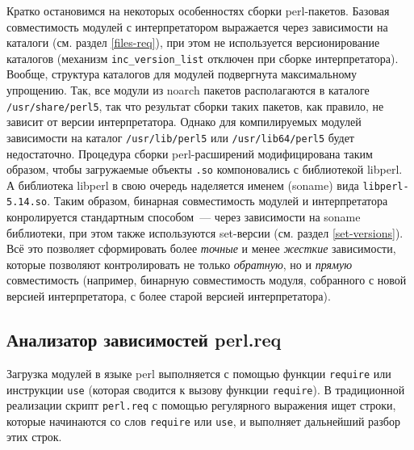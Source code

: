 \documentclass[russian,a4paper,12pt,titlepage]{article}
\begin{document}
Кратко остановимся на некоторых особенностях сборки perl-пакетов.  Базовая совместимость модулей
с интерпретатором выражается через зависимости на каталоги (см. раздел \ref{files-req}), при этом
не используется версионирование каталогов (механизм \verb|inc_version_list|
отключен при сборке интерпретатора).  Вообще, структура каталогов для модулей подвергнута максимальному упрощению.
Так, все модули из noarch пакетов располагаются в каталоге \verb|/usr/share/perl5|, так что результат
сборки таких пакетов, как правило, не зависит от версии интерпретатора.  Однако для компилируемых
модулей зависимости на каталог \verb|/usr/lib/perl5| или \verb|/usr/lib64/perl5| будет недостаточно.
Процедура сборки perl-расширений модифицирована таким образом, чтобы загружаемые объекты \verb|.so| компоновались
с библиотекой libperl.  А библиотека libperl в свою очередь наделяется именем (soname) вида \verb|libperl-5.14.so|.
Таким образом, бинарная совместимость модулей и интерпретатора конролируется стандартным способом~--- через
зависимости на soname библиотеки, при этом также используются set-версии (см. раздел \ref{set-versions}).
Всё это позволяет сформировать более \textit{точные} и менее \textit{жесткие} зависимости, которые позволяют
контролировать не только \textit{обратную}, но и \textit{прямую} совместимость (например,
бинарную совместимость модуля, собранного с новой версией интерпретатора, с более старой версией интерпретатора).

\subsection{Анализатор зависимостей perl.req}
\label{perl-req}
Загрузка модулей в языке perl выполняется с помощью функции \verb|require| или
инструкции \verb|use| (которая сводится к вызову функции \verb|require|).
В традиционной реализации скрипт \verb|perl.req| с помощью регулярного
выражения ищет строки, которые начинаются со слов \verb|require| или \verb|use|,
и выполняет дальнейший разбор этих строк.
\end{document}
